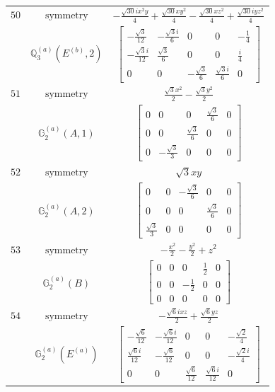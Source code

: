 \documentclass[fleqn,8pt,landscape]{jsarticle}
\begin{document}
\begin{longtable}{ccc}
$ 50 $ & $ \text{symmetry} $ & $ - \frac{\sqrt{30} i x^{2} y}{4} + \frac{\sqrt{30} x y^{2}}{4} - \frac{\sqrt{30} x z^{2}}{4} + \frac{\sqrt{30} i y z^{2}}{4} $ \\
$  $ & $ \mathbb{Q}_{3}^{(a)}(E^{(b)},2) $ & $ \begin{bmatrix} - \frac{\sqrt{3}}{12} & - \frac{\sqrt{3} i}{6} & 0 & 0 & - \frac{1}{4} \\ - \frac{\sqrt{3} i}{12} & \frac{\sqrt{3}}{6} & 0 & 0 & \frac{i}{4} \\ 0 & 0 & - \frac{\sqrt{3}}{6} & \frac{\sqrt{3} i}{6} & 0 \end{bmatrix} $ \\ \hline
$ 51 $ & $ \text{symmetry} $ & $ \frac{\sqrt{3} x^{2}}{2} - \frac{\sqrt{3} y^{2}}{2} $ \\
$  $ & $ \mathbb{G}_{2}^{(a)}(A,1) $ & $ \begin{bmatrix} 0 & 0 & 0 & \frac{\sqrt{3}}{6} & 0 \\ 0 & 0 & \frac{\sqrt{3}}{6} & 0 & 0 \\ 0 & - \frac{\sqrt{3}}{3} & 0 & 0 & 0 \end{bmatrix} $ \\ \hline
$ 52 $ & $ \text{symmetry} $ & $ \sqrt{3} x y $ \\
$  $ & $ \mathbb{G}_{2}^{(a)}(A,2) $ & $ \begin{bmatrix} 0 & 0 & - \frac{\sqrt{3}}{6} & 0 & 0 \\ 0 & 0 & 0 & \frac{\sqrt{3}}{6} & 0 \\ \frac{\sqrt{3}}{3} & 0 & 0 & 0 & 0 \end{bmatrix} $ \\ \hline
$ 53 $ & $ \text{symmetry} $ & $ - \frac{x^{2}}{2} - \frac{y^{2}}{2} + z^{2} $ \\
$  $ & $ \mathbb{G}_{2}^{(a)}(B) $ & $ \begin{bmatrix} 0 & 0 & 0 & \frac{1}{2} & 0 \\ 0 & 0 & - \frac{1}{2} & 0 & 0 \\ 0 & 0 & 0 & 0 & 0 \end{bmatrix} $ \\ \hline
$ 54 $ & $ \text{symmetry} $ & $ - \frac{\sqrt{6} i x z}{2} + \frac{\sqrt{6} y z}{2} $ \\
$  $ & $ \mathbb{G}_{2}^{(a)}(E^{(a)}) $ & $ \begin{bmatrix} - \frac{\sqrt{6}}{12} & - \frac{\sqrt{6} i}{12} & 0 & 0 & - \frac{\sqrt{2}}{4} \\ \frac{\sqrt{6} i}{12} & - \frac{\sqrt{6}}{12} & 0 & 0 & - \frac{\sqrt{2} i}{4} \\ 0 & 0 & \frac{\sqrt{6}}{12} & \frac{\sqrt{6} i}{12} & 0 \end{bmatrix} $ \\ \hline

\end{longtable}
\end{document}
